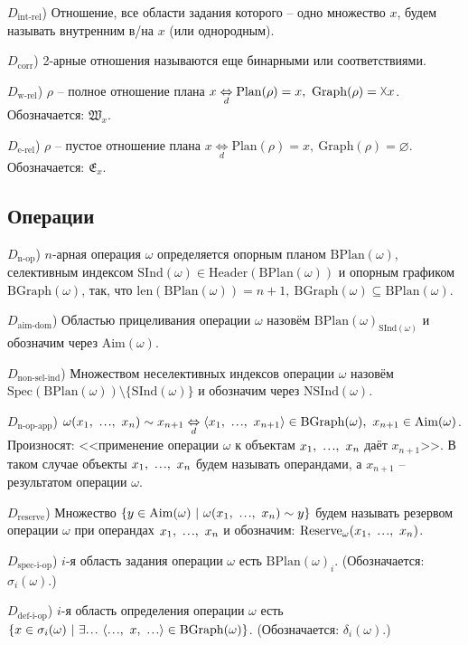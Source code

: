 \documentclass[a4paper]{article}
\newcommand\mydots{\hbox to 1em{.\hss.\hss.}}
\newcommand{\Def}[0]{\underset{d}{\Leftrightarrow}}
\newcommand{\Header}[1]{\mathrm{Header}(#1)}
\newcommand{\Plan}[1]{\mathrm{Plan}(#1)}
\newcommand{\Graph}[1]{\mathrm{Graph}(#1)}
\newcommand{\BPlan}[1]{\mathrm{BPlan}(#1)}
\newcommand{\BGraph}[1]{\mathrm{BGraph}(#1)}
\newcommand{\SInd}[1]{\mathrm{SInd}(#1)}
\newcommand{\NSInd}[1]{\mathrm{NSInd}(#1)}
\newcommand{\Aim}[1]{\mathrm{Aim}(#1)}
\newcommand{\Spec}[1]{\mathrm{Spec}(#1)}
\newcommand{\Reserve}[2]{\mathrm{Reserve}_{#1}(#2)}
\newcommand{\len}[1]{\mathrm{len}(#1)}
\begin{document}
$D_\text{int-rel}$) Отношение, все области задания которого -- одно множество $x$, будем называть внутренним в/на $x$ (или однородным).

$D_\text{corr}$) 2-арные отношения называются еще бинарными или соответствиями.

$D_\text{w-rel}$) $\rho$ -- полное отношение плана $x \Def \Plan{\rho} = x,~ \Graph{\rho} = \vartimes x$. Обозначается: $\mathfrak{W}_x$.

$D_\text{e-rel}$) $\rho$ -- пустое отношение плана $x \Def \Plan{\rho} = x,~ \Graph{\rho} = \varnothing$. Обозначается: $\mathfrak{E}_x$.

\subsection{Операции}

$D_\text{n-op}$) $n$-арная операция $\omega$ определяется опорным планом $\BPlan{\omega}$, селективным индексом $\SInd{\omega} \in \Header{\BPlan{\omega}}$ и опорным графиком $\BGraph{\omega}$, так, что $\len{\BPlan{\omega}} = n+1,~ \BGraph{\omega} \subseteq \BPlan{\omega}$.

$D_\text{aim-dom}$) Областью прицеливания операции $\omega$ назовём $\BPlan{\omega}_{\SInd{\omega}}$ и обозначим через $\Aim{\omega}$.

$D_\text{non-sel-ind}$) Множеством неселективных индексов операции $\omega$ назовём $\Spec{\BPlan{\omega}} \setminus \{ \SInd{\omega} \}$ и обозначим через $\NSInd{\omega}$.

$D_\text{n-op-app}$) $\omega (x_1,~ \mydots,~ x_n) \sim x_{n+1} \Def \langle x_1,~ \mydots,~ x_{n+1} \rangle \in \BGraph{\omega},~ x_{n+1} \in \Aim{\omega}$. Произносят: <<применение операции $\omega$ к объектам $x_1,~ \mydots,~ x_n$ даёт $x_{n+1}$>>. В таком случае объекты $x_1,~ \mydots,~ x_n$ будем называть операндами, а $x_{n+1}$ -- результатом операции $\omega$.

$D_\text{reserve}$) Множество $\{ y \in \Aim{\omega} ~|~ \omega (x_1,~ \mydots,~ x_n) \sim y \}$ будем называть резервом операции $\omega$ при операндах $x_1,~ \mydots,~ x_n$ и обозначим: $\Reserve{\omega}{ x_1,~ \mydots,~ x_n }$.

$D_\text{spec-i-op}$) $i$-я область задания операции $\omega$ есть $\BPlan{\omega}_i$. (Обозначается: $\sigma_i(\omega)$.)

$D_\text{def-i-op}$) $i$-я область определения операции $\omega$ есть $\{ x \in \sigma_i(\omega) ~|~ \exists \mydots~ \langle \mydots,~ x,~ \mydots \rangle \in \BGraph{\omega} \}$. (Обозначается: $\delta_i(\omega)$.)
\end{document}
